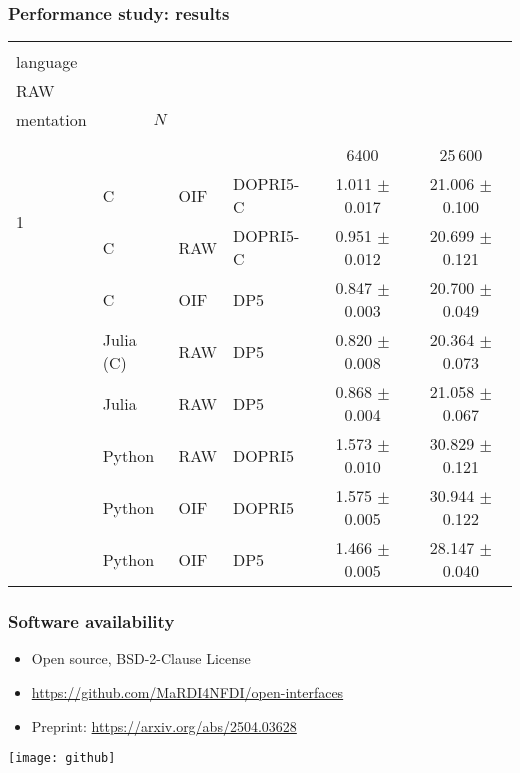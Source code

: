 \documentclass[
  10pt,
  aspectratio=169,
  english,
]{beamer}
\begin{document}
\begin{frame}
  \frametitle{Performance study: results}

\newcommand{\myheader}{%
\headerWithBreaks{0.2em}{\#} &
\headerWithBreaks{3em}{User\\language} &
\headerWithBreaks{1.5em}{OIF/\\RAW} &
\headerWithBreaks{3em}{Imple-\\mentation} &
                                \multicolumn{2}{c}{$N$} \\
                                \cmidrule(lr){5-6}
}
  \vspace{1em}
  \centering
  \begin{tabular}{l l l l c c}
    \toprule
    \myheader                                                                                    \\
                       &           &     &          & 6400                & 25\,600              \\
    \midrule
    \multirow{2}{*}{1} & C         & OIF & DOPRI5-C & 1.011 \(\pm\) 0.017 & 21.006 \(\pm\) 0.100 \\
                       & C         & RAW & DOPRI5-C & 0.951 \(\pm\) 0.012 & 20.699 \(\pm\) 0.121 \\
    \addlinespace
    \addlinespace
    \multirow{3}{*}{2} & C         & OIF & DP5      & 0.847 \(\pm\) 0.003 & 20.700 \(\pm\) 0.049 \\
                       & Julia (C) & RAW & DP5      & 0.820 \(\pm\) 0.008 & 20.364 \(\pm\) 0.073 \\
                       & Julia     & RAW & DP5      & 0.868 \(\pm\) 0.004 & 21.058 \(\pm\) 0.067 \\
    \addlinespace
    \addlinespace
    \multirow{3}{*}{3} & Python    & RAW & DOPRI5   & 1.573 \(\pm\) 0.010 & 30.829 \(\pm\) 0.121 \\
                       & Python    & OIF & DOPRI5   & 1.575 \(\pm\) 0.005 & 30.944 \(\pm\) 0.122 \\
                       & Python    & OIF & DP5      & 1.466 \(\pm\) 0.005 & 28.147 \(\pm\) 0.040 \\
    \bottomrule
  \end{tabular}
\end{frame}

% 

\begin{frame}
  \frametitle{Software availability}
  \begin{minipage}{0.618\textwidth}
    \begin{itemize}
      \item Open source, BSD-2-Clause License
      \item \url{https://github.com/MaRDI4NFDI/open-interfaces}
      \item Preprint: \url{https://arxiv.org/abs/2504.03628}
    \end{itemize}
  \end{minipage}%
  \begin{minipage}{0.382\textwidth}
    \texttt{[image: github]}
  \end{minipage}
\end{frame}
\end{document}
